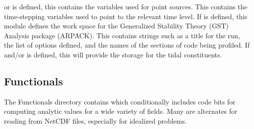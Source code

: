 \begin{klist}
    or  is defined, this contains the variables used
    for point sources.
   This contains the time-stepping variables used to
    point to the relevant time level.
   If  is
    defined, this module defines the work space for the Generalized
    Stability Theory (GST) Analysis package (ARPACK).
   This contains strings such as a title for the run,
    the list of  options defined, and the names of the sections of
    code being profiled.
    If  and/or  is
    defined, this will provide the storage for the tidal constituents.
\end{klist}

\subsection{Functionals}
\label{Functionals}
The Functionals directory contains  which
conditionally includes code bits for computing analytic values for a
wide variety of fields. Many are alternates for reading from NetCDF
files, especially for idealized problems.
